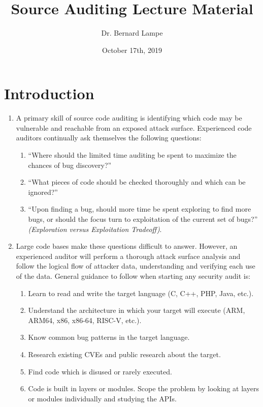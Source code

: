 \documentclass[12pt]{Training}
\title{Source Auditing Lecture Material}
\author{Dr. Bernard Lampe}
\date{October 17th, 2019}
\begin{document}
\maketitle


\section*{Introduction}
\begin{enumerate}
	\item A primary skill of source code auditing is identifying which code may be vulnerable and reachable from an exposed attack surface. Experienced code auditors continually ask themselves the following questions:
		\begin{enumerate}
			\item ``Where should the limited time auditing be spent to maximize the chances of bug discovery?''
		 	\item ``What pieces of code should be checked thoroughly and which can be ignored?''
		 	\item ``Upon finding a bug, should more time be spent exploring to find more bugs, or should the focus turn to exploitation of the current set of bugs?'' \emph{(Exploration versus Exploitation Tradeoff)}.
		\end{enumerate}
	\item Large code bases make these questions difficult to answer. However, an experienced auditor will perform a thorough attack surface analysis and follow the logical flow of attacker data, understanding and verifying each use of the data. General guidance to follow when starting any security audit is:
	\begin{enumerate}
		\item Learn to read and write the target language (C, C++, PHP, Java, etc.).
		\item Understand the architecture in which your target will execute (ARM, ARM64, x86, x86-64, RISC-V, etc.).
		\item Know common bug patterns in the target language.
		\item Research existing CVEs and public research about the target.
		\item Find code which is disused or rarely executed.
		\item Code is built in layers or modules. Scope the problem by looking at layers or modules individually and studying the APIs.

\end{enumerate}
\end{enumerate}
\end{document}
